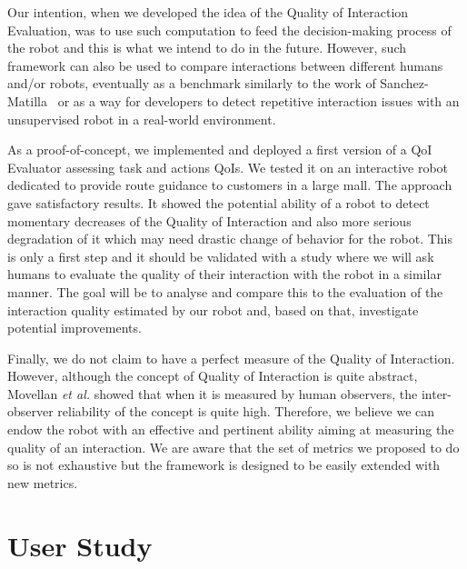 \documentclass[a4paper,11pt,twoside]{StyleThese}
\begin{document}
Our intention, when we developed the idea of the Quality of Interaction Evaluation, was to use such computation to feed the decision-making process of the robot and this is what we intend to do in the future. However, such framework can also be used to compare interactions between different humans and/or robots, eventually as a benchmark similarly to the work of Sanchez-Matilla~\cite{sanchez} or as a way for developers to detect repetitive interaction issues with an unsupervised robot in a real-world environment.

As a proof-of-concept, we implemented and deployed a first version of a QoI Evaluator assessing task and actions QoIs. We tested it on an interactive robot dedicated to provide route guidance to customers in a large mall. The approach gave satisfactory results. It showed the potential ability of a robot to detect momentary decreases of the Quality of Interaction and also more serious degradation of it which may need drastic change of behavior for the robot. This is only a first step and it should be validated with a study where we will ask humans to evaluate the quality of their interaction with the robot in a similar manner. The goal will be to analyse and compare this to the evaluation of the interaction quality estimated by our robot and, based on that, investigate potential improvements. 

Finally, we do not claim to have a perfect measure of the Quality of Interaction. However, although the concept of Quality of Interaction is quite abstract, Movellan \textit{et al.} showed that when it is measured by human observers, the inter-observer reliability of the concept is quite high. Therefore, we believe we can endow the robot with an effective and pertinent ability aiming at measuring the quality of an interaction. We are aware that the set of metrics we proposed to do so is not exhaustive but the framework is designed to be easily extended with new metrics.

\section{User Study}

\ifdefined{}
\else


\end{document}
